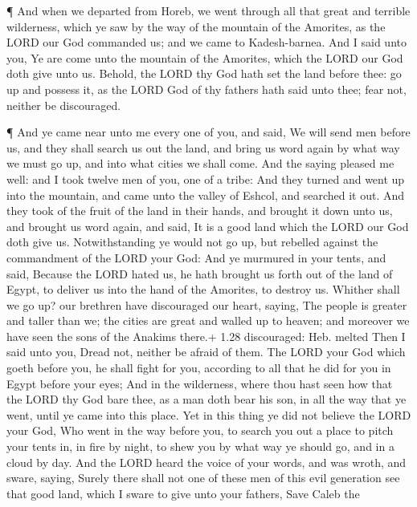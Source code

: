  ¶ And when we departed from Horeb, we went through all
that great and terrible wilderness, which ye saw by the way of the
mountain of the Amorites, as the LORD our God commanded us; and we came
to Kadesh-barnea.  And I said unto you, Ye are come unto
the mountain of the Amorites, which the LORD our God doth give unto us.
 Behold, the LORD thy God hath set the land before thee: go
up and possess it, as the LORD God of thy fathers hath said unto thee;
fear not, neither be discouraged.

 ¶ And ye came near unto me every one of you, and said, We
will send men before us, and they shall search us out the land, and
bring us word again by what way we must go up, and into what cities we
shall come.  And the saying pleased me well: and I took
twelve men of you, one of a tribe:  And they turned and
went up into the mountain, and came unto the valley of Eshcol, and
searched it out.  And they took of the fruit of the land in
their hands, and brought it down unto us, and brought us word again, and
said, It is a good land which the LORD our God doth give us.
 Notwithstanding ye would not go up, but rebelled against
the commandment of the LORD your God:  And ye murmured in
your tents, and said, Because the LORD hated us, he hath brought us
forth out of the land of Egypt, to deliver us into the hand of the
Amorites, to destroy us.  Whither shall we go up? our
brethren have discouraged our heart, saying, The people is greater and
taller than we; the cities are great and walled up to heaven; and
moreover we have seen the sons of the Anakims there.+ 1.28 discouraged:
Heb. melted  Then I said unto you, Dread not, neither be
afraid of them.  The LORD your God which goeth before you,
he shall fight for you, according to all that he did for you in Egypt
before your eyes;  And in the wilderness, where thou hast
seen how that the LORD thy God bare thee, as a man doth bear his son, in
all the way that ye went, until ye came into this place. 
Yet in this thing ye did not believe the LORD your God, 
Who went in the way before you, to search you out a place to pitch your
tents in, in fire by night, to shew you by what way ye should go, and in
a cloud by day.  And the LORD heard the voice of your
words, and was wroth, and sware, saying,  Surely there
shall not one of these men of this evil generation see that good land,
which I sware to give unto your fathers,  Save Caleb the
